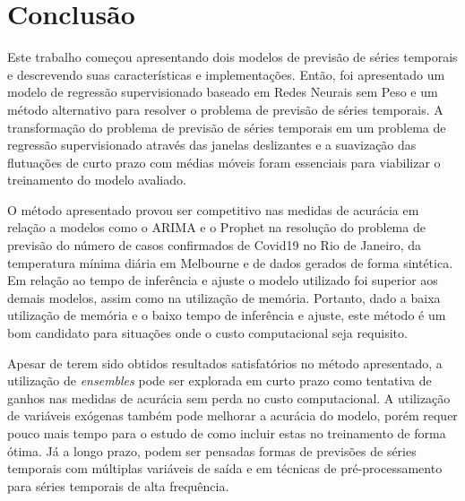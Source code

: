 \chapter{Conclusão}
\label{chap:06}

Este trabalho começou apresentando dois modelos de previsão de séries temporais e descrevendo suas características e implementações. Então, foi apresentado um modelo de regressão supervisionado baseado em Redes Neurais sem Peso e um método alternativo para resolver o problema de previsão de séries temporais. A transformação do problema de previsão de séries temporais em um problema de regressão supervisionado através das janelas deslizantes e a suavização das flutuações de curto prazo com médias móveis foram essenciais para viabilizar o treinamento do modelo avaliado.

O método apresentado provou ser competitivo nas medidas de acurácia em relação a modelos como o ARIMA e o Prophet na resolução do problema de previsão do número de casos confirmados de Covid19 no Rio de Janeiro, da temperatura mínima diária em Melbourne e de dados gerados de forma sintética. Em relação ao tempo de inferência e ajuste o modelo utilizado foi superior aos demais modelos, assim como na utilização de memória. Portanto, dado a baixa utilização de memória e o baixo tempo de inferência e ajuste, este método é um bom candidato para situações onde o custo computacional seja requisito.

Apesar de terem sido obtidos resultados satisfatórios no método apresentado, a utilização de \textit{ensembles} pode ser explorada em curto prazo como tentativa de ganhos nas medidas de acurácia sem perda no custo computacional. A utilização de variáveis exógenas também pode melhorar a acurácia do modelo, porém requer pouco mais tempo para o estudo de como incluir estas no treinamento de forma ótima. Já a longo prazo, podem ser pensadas formas de previsões de séries temporais com múltiplas variáveis de saída e em técnicas de pré-processamento para séries temporais de alta frequência.
